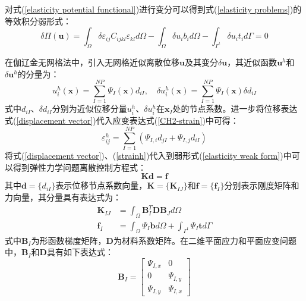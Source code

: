 对式(\ref{elasticity potential functional})进行变分可以得到式(\ref{elasticity problems})的等效积分弱形式：
\begin{equation}\label{elasticity weak form}
    \delta\Pi(\pmb{u})=\int_{\Omega}\delta\varepsilon_{ij}C_{ijkl}\varepsilon_{kl}d\Omega-\int_{\Omega}\delta u_ib_id\Omega-\int_{\Gamma^t}\delta u_it_id\Gamma=0
\end{equation}\par
在伽辽金无网格法中，引入无网格近似离散位移$\pmb u$及其变分$\delta \pmb u$，其近似函数$\pmb u^h$和$\delta \pmb u^h$的分量为：
\begin{equation}\label{displacement vector}
    u^h_{i}(\pmb x) = \sum_{I=1}^{N\!P}\Psi_I(\pmb x) d_{iI}, \quad \delta u^h_{i}(\pmb x) = \sum_{I=1}^{N\!P}\Psi_I(\pmb x) \delta d_{iI}
\end{equation}
式中$d_{iI}$、$\delta d_{iI}$分别为近似位移分量$u^h_i$、$\delta u^h_i$在$\pmb x_I$处的节点系数。进一步将位移表达式(\ref{displacement vector})代入应变表达式(\ref{CH2-strain})中可得：
\begin{equation}\label{strainh}
\varepsilon^h_{ij} = \sum_{I=1}^{N\!P} (\Psi_{I,i}d_{jI}+\Psi_{I,j}d_{iI})
\end{equation}
将式(\ref{displacement vector})、(\ref{strainh})代入到弱形式(\ref{elasticity weak form})中可以得到弹性力学问题离散控制方程式：
\begin{equation}
    \pmb{K}\pmb{d}=\pmb{f}
\end{equation}
其中$\pmb{d}=\{d_{iI}\}$表示位移节点系数向量，$\pmb{K}=\{\pmb K_{IJ}\}$和$\pmb{f}=\{\pmb f_I\}$分别表示刚度矩阵和力向量，其分量具有表达式为：
\begin{subequations}\label{EKf}
\begin{align}
        \pmb K_{IJ}&=\int_{\Omega}\pmb{B}_I^T\pmb{D}\pmb{B}_Jd\Omega\label{EKf1}\\
        \pmb f_I&=\int_{\Omega}\Psi_I\pmb{b}d\Omega+\int_{\Gamma^t}\Psi_I\pmb{t}d\Gamma\label{EKf2}
\end{align}
\end{subequations}
式中$\pmb B_I$为形函数梯度矩阵，$\pmb D$为材料系数矩阵。在二维平面应力和平面应变问题中，$\pmb B_I$和$\pmb D$具有如下表达式：
\begin{equation}\label{strain vector}
    \pmb{B}_I= \left[\begin{matrix}\Psi_{I,x}&0\\0&\Psi_{I,y}\\\Psi_{I,y}&\Psi_{I,x} \end{matrix}\right] 
\end{equation}
